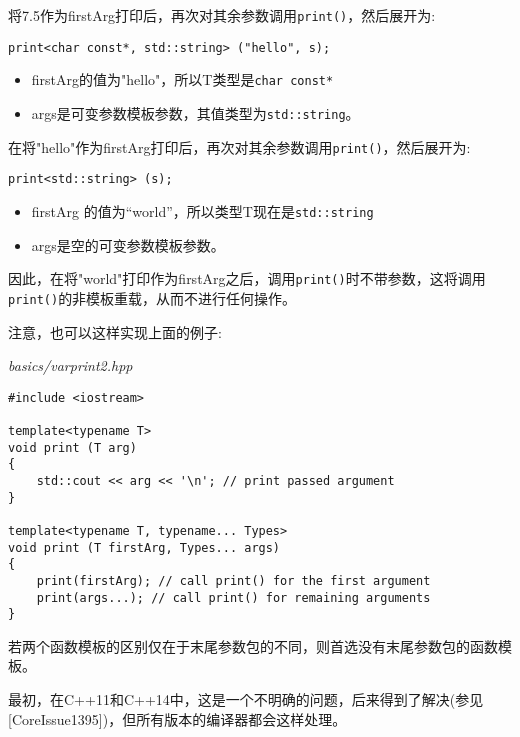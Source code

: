 将7.5作为firstArg打印后，再次对其余参数调用\texttt{print()}，然后展开为:

\begin{lstlisting}[style=styleCXX]
print<char const*, std::string> ("hello", s);
\end{lstlisting}

\begin{itemize}
\item 
firstArg的值为"hello"，所以T类型是\texttt{char const*}

\item 
args是可变参数模板参数，其值类型为\texttt{std::string}。
\end{itemize}

在将"hello"作为firstArg打印后，再次对其余参数调用\texttt{print()}，然后展开为:

\begin{lstlisting}[style=styleCXX]
print<std::string> (s);
\end{lstlisting}

\begin{itemize}
\item 
firstArg 的值为“world”，所以类型T现在是\texttt{std::string}

\item 
args是空的可变参数模板参数。
\end{itemize}

因此，在将"world"打印作为firstArg之后，调用\texttt{print()}时不带参数，这将调用\texttt{print()}的非模板重载，从而不进行任何操作。


注意，也可以这样实现上面的例子:

\noindent
\textit{basics/varprint2.hpp}
\begin{lstlisting}[style=styleCXX]
#include <iostream>

template<typename T>
void print (T arg)
{
	std::cout << arg << '\n'; // print passed argument
}

template<typename T, typename... Types>
void print (T firstArg, Types... args)
{
	print(firstArg); // call print() for the first argument
	print(args...); // call print() for remaining arguments
}
\end{lstlisting}

若两个函数模板的区别仅在于末尾参数包的不同，则首选没有末尾参数包的函数模板。

\begin{tcolorbox}[colback=webgreen!5!white,colframe=webgreen!75!black]
\hspace*{0.75cm}最初，在C++11和C++14中，这是一个不明确的问题，后来得到了解决(参见[CoreIssue1395])，但所有版本的编译器都会这样处理。
\end{tcolorbox}

